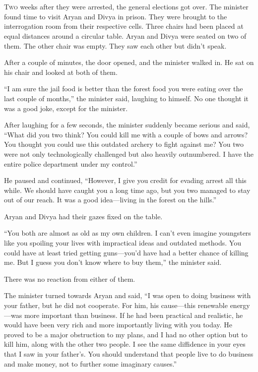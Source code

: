 \chapter{}

\lettrine{T}{wo} weeks after they were arrested, the general elections got over.
The minister found time to visit Aryan and Divya in prison. They were brought to
the interrogation room from their respective cells. Three chairs had been placed
at equal distances around a circular table. Aryan and Divya were seated on two
of them. The other chair was empty. They saw each other but didn't speak.

After a couple of minutes, the door opened, and the minister walked in. He sat
on his chair and looked at both of them.

“I am sure the jail food is better than the forest food you were eating over the
last couple of months,” the minister said, laughing to himself. No one thought
it was a good joke, except for the minister.

After laughing for a few seconds, the minister suddenly became serious and said,
“What did you two think? You could kill me with a couple of bows and arrows? You
thought you could use this outdated archery to fight against me? You two were
not only technologically challenged but also heavily outnumbered. I
have the entire police department under my control.”

He paused and continued, “However, I give you credit for evading arrest all this
while. We should have caught you a long time ago, but you two managed to stay
out of our reach. It was a good idea—living in the forest on the
hills.”

Aryan and Divya had their gazes fixed on the table.

“You both are almost as old as my own children. I can't even imagine youngsters
like you spoiling your lives with impractical ideas and outdated methods. You
could have at least tried getting guns—you'd have had a better chance of killing
me. But I guess you don't know where to buy them,” the minister said.

There was no reaction from either of them.

The minister turned towards Aryan and said, “I was open to doing business with your
father, but he did not cooperate. For him, his cause—this renewable energy—was
more important than business. If he had been practical and realistic, he would
have been very rich and more importantly living with you today. He proved to be a major
obstruction to my plans, and I had no other option but to kill him, along with
the other two people. I see the same diffidence in your eyes that I saw in your
father's. You should understand that people live to do business and make money,
not to further some imaginary causes.”

